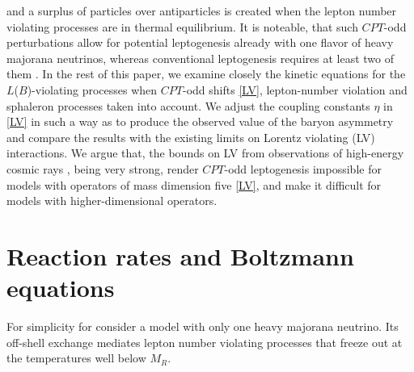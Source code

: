 \documentclass[12pt]{revtex4}
\begin{document}
    and a surplus of particles over antiparticles is created when the lepton number violating processes  are
	in thermal equilibrium.
	It is noteable, that such $CPT$-odd perturbations allow for potential leptogenesis already
	with one flavor of heavy majorana neutrinos, whereas conventional leptogenesis requires
	at least two of them \cite{Fukugita:1986hr}.
	In the rest of this paper, we examine closely the kinetic equations for the 
    $L$($B$)-violating processes when $CPT$-odd shifts \eqref{LV}, lepton-number violation and 
    sphaleron processes taken into account. 
	We adjust the coupling constants $ \eta $ in \eqref{LV} in such a way as to produce 
	the observed value of the baryon asymmetry and compare the results with the existing
	limits on Lorentz violating (LV) interactions. 
	We argue that, the bounds on LV from observations of high-energy cosmic rays
\cite{Gagnon:2004xh}, 
	being very strong, render $CPT$-odd leptogenesis impossible for models with operators of 
	mass dimension five \eqref{LV}, and make it difficult for models with higher-dimensional operators.
	

%
%
\section{Reaction rates and Boltzmann equations}
\label{rates}

	For simplicity for  consider a model with only one heavy 
majorana neutrino. Its off-shell exchange mediates lepton number violating processes that 
	freeze out at the temperatures well below $ M_R $.
\end{document}
